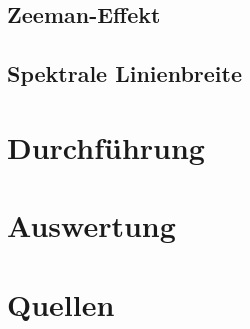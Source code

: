 \documentclass[numbers=noenddot,12pt,a4paper]{scrartcl}
\begin{document}
\subsection{Zeeman-Effekt}
\subsection{Spektrale Linienbreite}
\section{Durchführung}
\section{Auswertung}
\section{Quellen}
\end{document}
